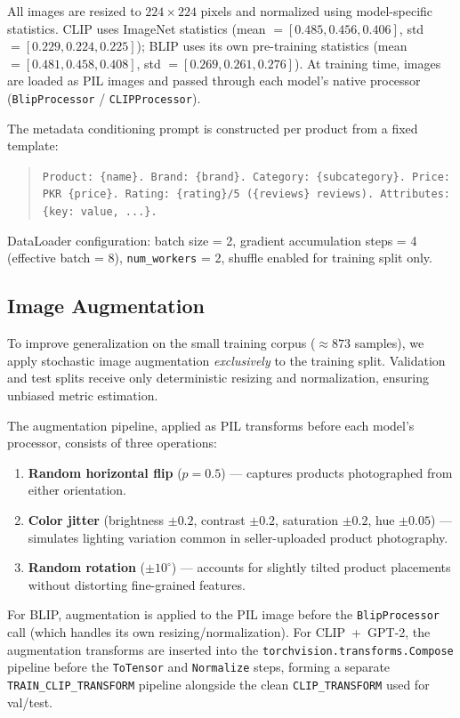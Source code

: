 \documentclass[12pt,a4paper]{article}
\begin{document}
All images are resized to $224 \times 224$ pixels and normalized using model-specific
statistics. CLIP uses ImageNet statistics (mean $= [0.485, 0.456, 0.406]$, std $=
[0.229, 0.224, 0.225]$); BLIP uses its own pre-training statistics (mean $= [0.481,
0.458, 0.408]$, std $= [0.269, 0.261, 0.276]$). At training time, images are loaded
as PIL images and passed through each model's native processor (\texttt{BlipProcessor}
/ \texttt{CLIPProcessor}).

The metadata conditioning prompt is constructed per product from a fixed template:
\begin{quote}
\texttt{Product: \{name\}. Brand: \{brand\}. Category: \{subcategory\}.
Price: PKR \{price\}. Rating: \{rating\}/5 (\{reviews\} reviews).
Attributes: \{key: value, ...\}.}
\end{quote}

DataLoader configuration: batch size = 2, gradient accumulation steps = 4 (effective
batch = 8), \texttt{num\_workers} = 2, shuffle enabled for training split only.

\subsection{Image Augmentation}

To improve generalization on the small training corpus ($\approx873$ samples), we
apply stochastic image augmentation \emph{exclusively} to the training split. Validation
and test splits receive only deterministic resizing and normalization, ensuring unbiased
metric estimation.

The augmentation pipeline, applied as PIL transforms before each model's processor,
consists of three operations:
\begin{enumerate}[noitemsep]
  \item \textbf{Random horizontal flip} ($p = 0.5$) --- captures products photographed
        from either orientation.
  \item \textbf{Color jitter} (brightness $\pm 0.2$, contrast $\pm 0.2$, saturation
        $\pm 0.2$, hue $\pm 0.05$) --- simulates lighting variation common in
        seller-uploaded product photography.
  \item \textbf{Random rotation} ($\pm 10^\circ$) --- accounts for slightly tilted
        product placements without distorting fine-grained features.
\end{enumerate}

For BLIP, augmentation is applied to the PIL image before the \texttt{BlipProcessor}
call (which handles its own resizing/normalization). For CLIP~+~GPT-2, the augmentation
transforms are inserted into the \texttt{torchvision.transforms.Compose} pipeline before
the \texttt{ToTensor} and \texttt{Normalize} steps, forming a separate
\texttt{TRAIN\_CLIP\_TRANSFORM} pipeline alongside the clean \texttt{CLIP\_TRANSFORM}
used for val/test.
\end{document}
